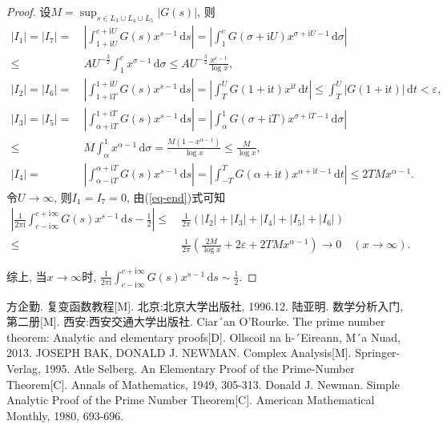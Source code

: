\documentclass[12pt, a4paper, oneside]{ctexart}
\numberwithin{equation}{section}  %
\let\leq=\leqslant %
\let\epsilon=\varepsilon %
\def\d{\mathrm{d}}          %
\def\i{\mathrm{i}}          %
\begin{document}
\begin{proof}
    设$M = \sup_{s\in L_3\cup L_4\cup L_5}|G(s)|$, 则
    \begin{equation*}
        \begin{aligned}
            |I_1| = |I_7| =&\ \left|\int_{1+\i U}^{c+\i U}G(s)x^{s-1}\,\d s\right| = \left|\int_1^cG(\sigma+\i U)x^{\sigma+\i U-1}\,\d \sigma\right|\\
            \leq&\ AU^{-\frac{3}{2}}\int_1^cx^{\sigma-1}\,\d \sigma\leq AU^{-\frac{3}{2}}\frac{x^{c-1}}{\log x},\\
            |I_2| = |I_6| =&\ \left|\int_{1+\i T}^{1+\i U}G(s)x^{s-1}\,\d s\right| = \left|\int_{T}^{U}G(1+\i t)x^{\i t}\,\d t\right| \leq \int_T^U|G(1+\i t)|\,\d t < \epsilon,\\
            |I_3| = |I_5| =&\ \left|\int_{\alpha+\i T}^{1+\i T}G(s)x^{s-1}\,\d s\right| = \left|\int_{\alpha}^1G(\sigma + \i T)x^{\sigma+\i T-1}\,\d \sigma\right|\\
            \leq&\ M\int_{\alpha}^1x^{\alpha-1}\,\d\sigma = \frac{M(1-x^{\alpha-1})}{\log x}\leq \frac{M}{\log x},\\
            |I_4|=&\ \left|\int_{\alpha-\i T}^{\alpha+\i T}G(s)x^{s-1}\,\d s\right|=\left|\int_{-T}^TG(\alpha+\i t)x^{\alpha+\i t-1}\,\d t\right|\leq 2TMx^{\alpha-1}.
        \end{aligned}
    \end{equation*}
    令$U\to \infty$, 则$I_1=I_7=0$, 由(\ref{eq-end})式可知
    \begin{equation*}
        \begin{aligned}
        \left|\frac{1}{2\pi \i}\int_{c-\i\infty}^{c+\i\infty}G(s)x^{s-1}\,\d s-\frac{1}{2}\right|\leq&\ \frac{1}{2\pi}(|I_2|+|I_3|+|I_4|+|I_5|+|I_6|)\\
        \leq&\ \frac{1}{2\pi}\left(\frac{2M}{\log x}+2\epsilon+2TMx^{\alpha-1}\right)\to 0\quad(x\to \infty).
        \end{aligned}
    \end{equation*}

    综上, 当$x\to\infty$时, $\frac{1}{2\pi\i}\int_{c-\i\infty}^{c+\i\infty}G(s)x^{s-1}\,\d s\sim \frac{1}{2}$.
\end{proof}

\clearpage
\begin{thebibliography}{99}
    方企勤. 复变函数教程[M]. 北京:北京大学出版社, 1996.12.
    陆亚明. 数学分析入门, 第二册[M]. 西安:西安交通大学出版社.
    Ciar´an O’Rourke. The prime number theorem: Analytic and elementary proofs[D]. Ollscoil na h-´Eireann, M´a Nuad, 2013.
    JOSEPH BAK, DONALD J. NEWMAN. Complex Analysis[M]. Springer-Verlag, 1995.
    Atle Selberg. An Elementary Proof of the Prime-Number Theorem[C]. Annals of Mathematics, 1949, 305-313.
    Donald J. Newman. Simple Analytic Proof of the Prime Number Theorem[C]. American Mathematical Monthly, 1980, 693-696.
\end{thebibliography}
\end{document}

